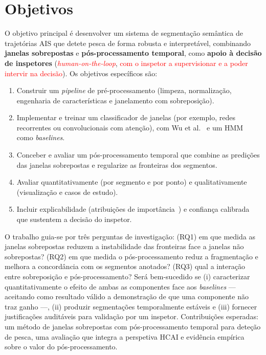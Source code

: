\documentclass{article}
\begin{document}
\section{Objetivos}
\label{sec:objetivos}

O objetivo principal é desenvolver um sistema de segmentação semântica de trajetórias AIS que detete pesca de forma robusta e interpretável, combinando \textbf{janelas sobrepostas} e \textbf{pós-processamento temporal}, como \textbf{apoio à decisão de inspetores} (\textcolor{red}{\emph{human-on-the-loop}}, \textcolor{red}{com o inspetor a supervisionar e a poder intervir na decisão}). Os objetivos específicos são:

\begin{enumerate}
    \item Construir um \emph{pipeline} de pré-processamento (limpeza, normalização, engenharia de características e janelamento com sobreposição).
    \item Implementar e treinar um classificador de janelas (por exemplo, redes recorrentes ou convolucionais com atenção), com Wu et al.~ e um HMM~\cite{peel2011} como \emph{baselines}.
    \item Conceber e avaliar um pós-processamento temporal que combine as predições das janelas sobrepostas e regularize as fronteiras dos segmentos.
    \item Avaliar quantitativamente (por segmento e por ponto) e qualitativamente (visualização e casos de estudo).
    \item Incluir explicabilidade (atribuições de importância~\cite{lundberg2017}) e confiança calibrada~\cite{guo2017} que sustentem a decisão do inspetor.
\end{enumerate}

O trabalho guia-se por três perguntas de investigação: (RQ1) em que medida as janelas sobrepostas reduzem a instabilidade das fronteiras face a janelas não sobrepostas? (RQ2) em que medida o pós-processamento reduz a fragmentação e melhora a concordância com os segmentos anotados? (RQ3) qual a interação entre sobreposição e pós-processamento? Será bem-sucedido se (i) caracterizar quantitativamente o efeito de ambas as componentes face aos \emph{baselines} --- aceitando como resultado válido a demonstração de que uma componente não traz ganho ---, (ii) produzir segmentações temporalmente estáveis e (iii) fornecer justificações auditáveis para validação por um inspetor. Contribuições esperadas: um método de janelas sobrepostas com pós-processamento temporal para deteção de pesca, uma avaliação que integra a perspetiva HCAI e evidência empírica sobre o valor do pós-processamento.
\end{document}
